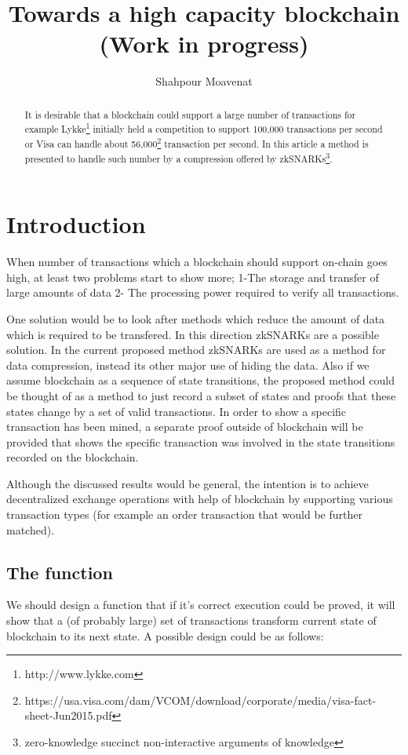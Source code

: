 \documentclass{article}
\title{Towards a high capacity blockchain (Work in progress)}
\author{Shahpour Moavenat}
\affil{Lykke Corp}
\begin{document}
	
\maketitle
	
\begin{abstract}
	It is desirable that a blockchain could support a large number of transactions for example Lykke\footnote{http://www.lykke.com} initially held a competition to support 100,000 transactions per second or Visa can handle about 56,000\footnote{https://usa.visa.com/dam/VCOM/download/corporate/media/visa-fact-sheet-Jun2015.pdf} transaction per second.
	In this article a method is presented to handle such number by a compression offered by zkSNARKs\footnote{zero-knowledge succinct non-interactive arguments of knowledge}.
\end{abstract}

\section{Introduction}
When number of transactions which a blockchain should support on-chain goes high, at least two problems start to show more; 1-The storage and transfer of large amounts of data 2- The processing power required to verify all transactions.

One solution would be to look after methods which reduce the amount of data which is required to be transfered. In this direction zkSNARKs are a possible solution. In the current proposed method zkSNARKs are used as a method for data compression, instead its other major use of hiding the data. Also if we assume blockchain as a sequence of state transitions, the proposed method could be thought of as a method to just record a subset of states and proofs that these states change by a set of valid transactions. In order to show a specific transaction has been mined, a separate proof outside of blockchain will be provided that shows the specific transaction was involved in the state transitions recorded on the blockchain.

Although the discussed results would be general, the intention is to achieve decentralized exchange operations with help of blockchain by supporting various transaction types (for example an order transaction that would be further matched).

\subsection{The function}
We should design a function that if it's correct execution could be proved, it will show that a (of probably large) set of transactions transform current state of  blockchain to its next state. A possible design could be as follows:
\end{document}

